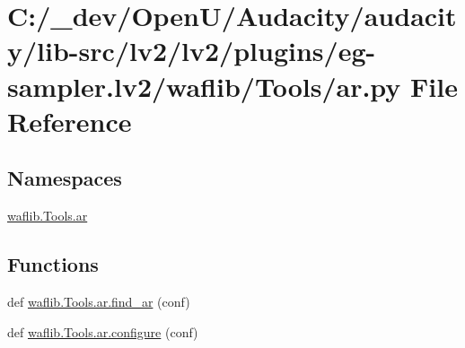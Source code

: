 \hypertarget{lv2_2plugins_2eg-sampler_8lv2_2waflib_2_tools_2ar_8py}{}\section{C\+:/\+\_\+dev/\+Open\+U/\+Audacity/audacity/lib-\/src/lv2/lv2/plugins/eg-\/sampler.lv2/waflib/\+Tools/ar.py File Reference}
\label{lv2_2plugins_2eg-sampler_8lv2_2waflib_2_tools_2ar_8py}
\subsection*{Namespaces}
\begin{DoxyCompactItemize}
\item 
 \hyperlink{namespacewaflib_1_1_tools_1_1ar}{waflib.\+Tools.\+ar}
\end{DoxyCompactItemize}
\subsection*{Functions}
\begin{DoxyCompactItemize}
\item 
def \hyperlink{namespacewaflib_1_1_tools_1_1ar_ade578f6e88784a6a5524a2ff2333096b}{waflib.\+Tools.\+ar.\+find\+\_\+ar} (conf)
\item 
def \hyperlink{namespacewaflib_1_1_tools_1_1ar_adac714580d14727514e133de54b6c0b3}{waflib.\+Tools.\+ar.\+configure} (conf)
\end{DoxyCompactItemize}
